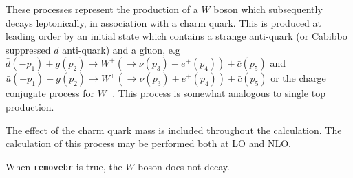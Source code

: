 \label{subsec:wc}

These processes represent the production of a $W$ boson which
subsequently decays leptonically, in association with a charm
quark. 
This is produced at leading order by an initial state which
contains a strange anti-quark (or Cabibbo suppressed $d$ anti-quark) and a
gluon, e.g
$ \bar{d}(-p_1)+g(p_2) \to W^+(\to \nu(p_3)+e^+(p_4))+\bar{c}(p_5)$
and
$ \bar{u}(-p_1)+g(p_2) \to W^+(\to \nu(p_3)+e^+(p_4))+\bar{c}(p_5)$
or the charge conjugate process for $W^{-}$.
This process is somewhat analogous to single top production.

The effect of the charm quark mass is included throughout the
calculation.  The calculation of this process may
be performed both at LO and NLO.

When {\tt removebr} is true, the $W$ boson does not decay.
